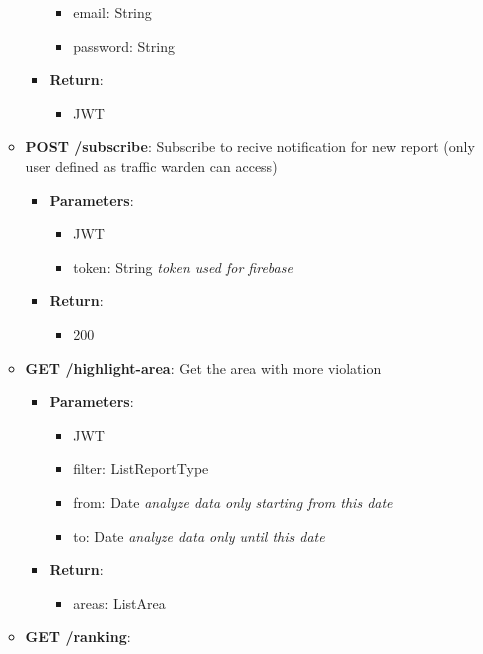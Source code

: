 \documentclass{article}
\begin{document}
\begin{itemize}
\begin{itemize}
\begin{itemize}
						\begin{itemize}
							\item email: String
							\item password: String
						\end{itemize}
					\item \textbf{Return}:
						\begin{itemize}
							\item JWT
						\end{itemize}
				\end{itemize}
			\item \textbf{POST /subscribe}:
				Subscribe to recive notification for new report (only user defined as traffic warden can access)
				\begin{itemize}
					\item \textbf{Parameters}:
						\begin{itemize}
							\item JWT
							\item token: String \textit{token used for firebase}
						\end{itemize}
					\item \textbf{Return}:
						\begin{itemize}
							\item 200
						\end{itemize}
				\end{itemize}
			\item \textbf{GET /highlight-area}:
				Get the area with more violation
				\begin{itemize}
					\item \textbf{Parameters}:
						\begin{itemize}
							\item JWT
							\item filter: List\textlangle{}ReportType\textrangle{}
							\item from: Date \textit{analyze data only starting from this date}
							\item to: Date \textit{analyze data only until this date}
						\end{itemize}
					\item \textbf{Return}:
						\begin{itemize}
							\item areas: List\textlangle{}Area\textrangle{}
						\end{itemize}
				\end{itemize}
			\item \textbf{GET /ranking}:

\end{itemize}
\end{itemize}
\end{document}
